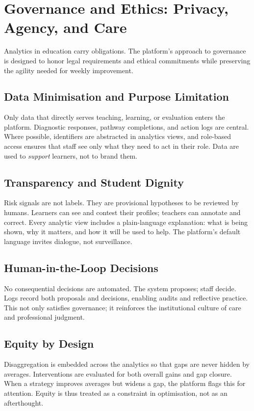\section{Governance and Ethics: Privacy, Agency, and Care}

Analytics in education carry obligations. The platform’s approach to governance is designed to honor legal requirements and ethical commitments while preserving the agility needed for weekly improvement.

\subsection{Data Minimisation and Purpose Limitation}

Only data that directly serves teaching, learning, or evaluation enters the platform. Diagnostic responses, pathway completions, and action logs are central. Where possible, identifiers are abstracted in analytics views, and role-based access ensures that staff see only what they need to act in their role. Data are used to \emph{support} learners, not to brand them.

\subsection{Transparency and Student Dignity}

Risk signals are not labels. They are provisional hypotheses to be reviewed by humans. Learners can see and contest their profiles; teachers can annotate and correct. Every analytic view includes a plain-language explanation: what is being shown, why it matters, and how it will be used to help. The platform’s default language invites dialogue, not surveillance.

\subsection{Human-in-the-Loop Decisions}

No consequential decisions are automated. The system proposes; staff decide. Logs record both proposals and decisions, enabling audits and reflective practice. This not only satisfies governance; it reinforces the institutional culture of care and professional judgment.

\subsection{Equity by Design}

Disaggregation is embedded across the analytics so that gaps are never hidden by averages. Interventions are evaluated for both overall gains and gap closure. When a strategy improves averages but widens a gap, the platform flags this for attention. Equity is thus treated as a constraint in optimisation, not as an afterthought.

